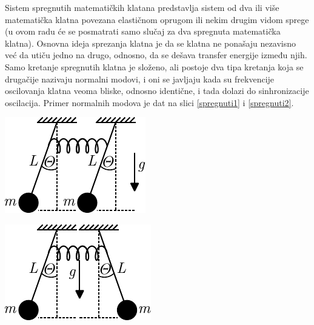 \documentclass[a4paper, 12pt, diplomski]{etf}
\begin{document}
Sistem spregnutih matematičkih klatana predstavlja sistem od dva ili više matematička klatna povezana elastičnom oprugom ili nekim drugim vidom sprege (u ovom radu će se posmatrati samo slučaj za dva spregnuta matematička klatna). Osnovna ideja sprezanja klatna je da se klatna ne ponašaju nezavisno već da utiču jedno na drugo, odnosno, da se dešava transfer energije između njih. Samo kretanje spregnutih klatna je složeno, ali postoje dva tipa kretanja koja se drugačije nazivaju normalni modovi, i oni se javljaju kada su frekvencije oscilovanja klatna veoma bliske, odnosno identične, i tada dolazi do sinhronizacije oscilacija. Primer normalnih modova je dat na slici \ref{spregnuti1} i \ref{spregnuti2}.

\begin{center}
\begin{minipage}{0.5\textwidth}
\centering
\includegraphics[scale=1.5]{imgs_teorija/spregnuto_klatno_1.pdf}
\label{spregnuti1}
\end{minipage}%
\begin{minipage}{0.5\textwidth}
\centering
\includegraphics[scale=1.5]{imgs_teorija/spregnuto_klatno_2.pdf} 
\label{spregnuti2} 
\end{minipage}
\end{center}
\end{document}
